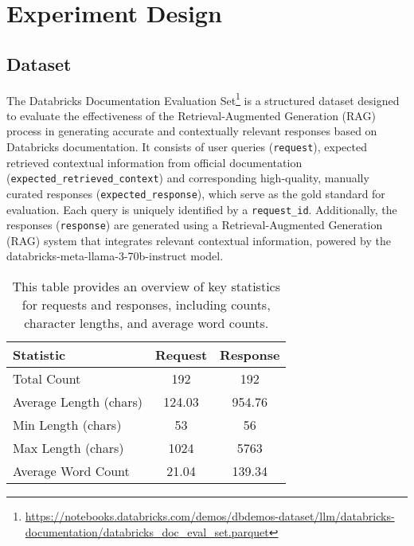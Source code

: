 \section{Experiment Design}\label{sec:Experiment}

\subsection{Dataset} 


The Databricks Documentation Evaluation Set\footnote{\url{https://notebooks.databricks.com/demos/dbdemos-dataset/llm/databricks-documentation/databricks_doc_eval_set.parquet}} is a structured dataset designed to evaluate the effectiveness of the Retrieval-Augmented Generation (RAG) process in generating accurate and contextually relevant responses based on Databricks documentation. It consists of user queries (\texttt{request}), expected retrieved contextual information from official documentation (\texttt{expected\_retrieved\_context}) and corresponding high-quality, manually curated responses (\texttt{expected\_response}), which serve as the gold standard for evaluation. Each query is uniquely identified by a \texttt{request\_id}. Additionally, the responses (\texttt{response}) are generated using a Retrieval-Augmented Generation (RAG) system that integrates relevant contextual information, powered by the databricks-meta-llama-3-70b-instruct model.



\begin{table}[!thb]\footnotesize
\centering
\begin{tabular}{lcc}
\hline
\textbf{Statistic}               & \textbf{Request} & \textbf{Response} \\ \hline
Total Count                      & 192                         & 192                          \\
Average Length (chars)           & 124.03                      & 954.76                       \\
Min Length (chars)               & 53                          & 56                           \\
Max Length (chars)               & 1024                        & 5763                         \\
Average Word Count               & 21.04                       & 139.34                       \\ \hline
\end{tabular}
\caption{This table provides an overview of key statistics for requests and responses, including counts, character lengths, and average word counts.}
\label{tab:request_response_statistics}
\end{table}


